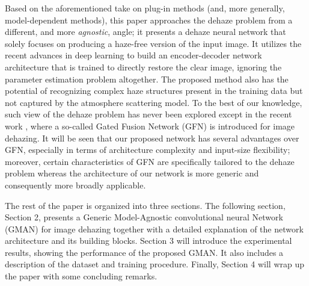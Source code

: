 \documentclass[journal]{IEEEtran}
\begin{document}





Based on the aforementioned take on plug-in methods (and, more generally, model-dependent methods), this paper approaches the dehaze problem from a different, and more \textit{agnostic}, angle; it presents a dehaze neural network that solely focuses on producing a haze-free version of the input image. It utilizes the recent advances in deep learning to build an encoder-decoder network architecture that is  trained to directly restore the clear image, ignoring the parameter estimation problem altogether. The proposed method also has the potential of recognizing complex haze structures present in the training data but not captured by the atmosphere scattering model. To the best of our knowledge, such view of the dehaze problem has never been explored except in the recent work  \cite{GFN}, where a so-called Gated Fusion Network (GFN) is introduced for image dehazing. It will be seen that our proposed network has several advantages over GFN, especially in terms of architecture complexity and input-size flexibility; moreover, certain characteristics of GFN are specifically tailored to the dehaze problem whereas the architecture of our network is more generic and consequently more broadly applicable. 

The rest of the paper is organized into three sections. The following section, Section 2, presents a Generic Model-Agnostic convolutional neural Network (GMAN) for image dehazing together with a detailed explanation of  the network architecture and its building blocks. Section 3 will introduce the experimental results, showing the performance of the proposed GMAN. It also includes a description of the dataset and training procedure. Finally, Section 4 will wrap up the paper with some concluding remarks.

%
%
%
%
\end{document}

